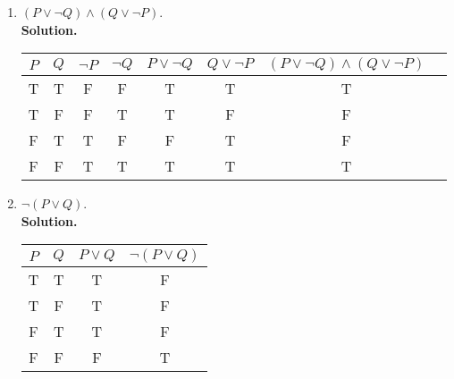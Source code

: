 \documentclass{report}
\newcommand{\sol}{\vspace{1em}\\\textbf{Solution.}\vspace{0.5em}}
\begin{document}
\begin{enumerate}[leftmargin=*]
\begin{enumerate}
              \item $(P \vee \neg Q) \wedge(Q \vee \neg P)$.
                    \sol{}
                    \begin{center}
                        \begin{tabular}{cccccccc}
                            $P$ & $Q$ & $\neg P$ & $\neg Q$ & $P \vee \neg Q$ & $Q \vee \neg P$ & $(P \vee \neg Q) \wedge(Q \vee \neg P)$ \\
                            \hline
                            T   & T   & F        & F        & T               & T               & T                                       \\
                            T   & F   & F        & T        & T               & F               & F                                       \\
                            F   & T   & T        & F        & F               & T               & F                                       \\
                            F   & F   & T        & T        & T               & T               & T
                        \end{tabular}
                    \end{center}

              \item $\neg(P \vee Q)$.
                    \sol{}
                    \begin{center}
                        \begin{tabular}{cccc}
                            $P$ & $Q$ & $P \vee Q$ & $\neg(P \vee Q)$ \\
                            \hline
                            T   & T   & T          & F                \\
                            T   & F   & T          & F                \\
                            F   & T   & T          & F                \\
                            F   & F   & F          & T
                        \end{tabular}
                    \end{center}


\end{enumerate}
\end{enumerate}
\end{document}
